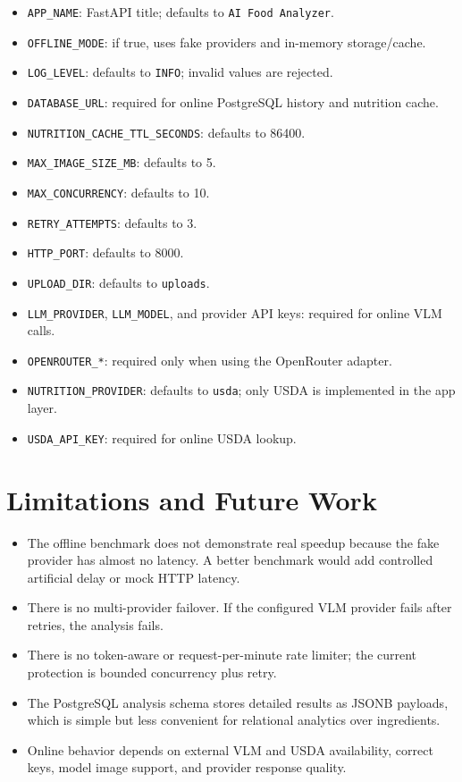 \documentclass[11pt,a4paper]{article}
\begin{document}
\begin{itemize}[leftmargin=2em]
  \item \texttt{APP\_NAME}: FastAPI title; defaults to \texttt{AI Food Analyzer}.
  \item \texttt{OFFLINE\_MODE}: if true, uses fake providers and in-memory storage/cache.
  \item \texttt{LOG\_LEVEL}: defaults to \texttt{INFO}; invalid values are rejected.
  \item \texttt{DATABASE\_URL}: required for online PostgreSQL history and nutrition cache.
  \item \texttt{NUTRITION\_CACHE\_TTL\_SECONDS}: defaults to 86400.
  \item \texttt{MAX\_IMAGE\_SIZE\_MB}: defaults to 5.
  \item \texttt{MAX\_CONCURRENCY}: defaults to 10.
  \item \texttt{RETRY\_ATTEMPTS}: defaults to 3.
  \item \texttt{HTTP\_PORT}: defaults to 8000.
  \item \texttt{UPLOAD\_DIR}: defaults to \texttt{uploads}.
  \item \texttt{LLM\_PROVIDER}, \texttt{LLM\_MODEL}, and provider API keys: required for online VLM calls.
  \item \texttt{OPENROUTER\_*}: required only when using the OpenRouter adapter.
  \item \texttt{NUTRITION\_PROVIDER}: defaults to \texttt{usda}; only USDA is implemented in the app layer.
  \item \texttt{USDA\_API\_KEY}: required for online USDA lookup.
\end{itemize}

\section{Limitations and Future Work}

\begin{itemize}[leftmargin=2em]
  \item The offline benchmark does not demonstrate real speedup because the fake provider has almost no latency. A better benchmark would add controlled artificial delay or mock HTTP latency.
  \item There is no multi-provider failover. If the configured VLM provider fails after retries, the analysis fails.
  \item There is no token-aware or request-per-minute rate limiter; the current protection is bounded concurrency plus retry.
  \item The PostgreSQL analysis schema stores detailed results as JSONB payloads, which is simple but less convenient for relational analytics over ingredients.
  \item Online behavior depends on external VLM and USDA availability, correct keys, model image support, and provider response quality.
\end{itemize}
\end{document}
